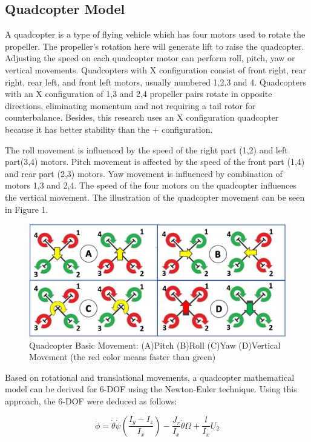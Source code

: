 \documentclass[a4paper]{jpconf}
\begin{document}
\subsection{Quadcopter Model}
A quadcopter is a type of flying vehicle which has four motors used to rotate the propeller. The propeller's rotation here will generate lift to raise the quadcopter. Adjusting the speed on each quadcopter motor can perform roll, pitch, yaw or vertical movements. Quadcopters with X configuration consist of front right, rear right, rear left, and front left motors, usually numbered 1,2,3 and 4. Quadcopters with an X configuration of 1,3 and 2,4 propeller pairs rotate in opposite directions, eliminating momentum and not requiring a tail rotor for counterbalance. Besides, this research uses an X configuration quadcopter because it has better stability than the + configuration.

The roll movement is influenced by the speed of the right part (1,2) and left part(3,4) motors. Pitch movement is affected by the speed of the front part (1,4) and rear part (2,3) motors. Yaw movement is influenced by combination of motors 1,3 and 2,4. The speed of the four motors on the quadcopter influences the vertical movement. The illustration of the quadcopter movement can be seen in Figure 1.

\begin{figure}[h]
    \centering
    \includegraphics[width=32pc]{quadcopter-basic-movement.png}
    \caption{\label{label}Quadcopter Basic Movement: (A)Pitch (B)Roll (C)Yaw (D)Vertical Movement (the red color means faster than green)}
\end{figure}

Based on rotational and translational movements, a quadcopter mathematical model can be derived for 6-DOF using the Newton-Euler technique. Using this approach, the 6-DOF were deduced as follows:

\begin{equation}
    \ddot{\phi}=\dot{\theta}\dot{\psi}\left ( \frac{I_{y}-I_{z}}{I_{x}} \right )-\frac{J_{r}}{I_{x}}\dot{\theta}\Omega+\frac{l}{I_{x}}U_{2}
\end{equation}
\end{document}
